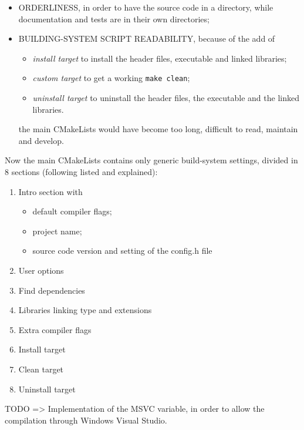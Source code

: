 \begin{itemize}
\item ORDERLINESS, in order to have the source code in a directory, while documentation and tests are in their own directories;
\item BUILDING-SYSTEM SCRIPT READABILITY, because of the add of
  \begin{itemize}
  \item \textit{install target} to install the header files, executable and linked libraries;
  \item \textit{custom target} to get a working \lstinline!make clean!;
  \item \textit{uninstall target} to uninstall the header files, the executable and the linked libraries.
  \end{itemize}
  the main CMakeLists would have become too long, difficult to read, maintain and develop.
\end{itemize}
\noindent Now the main CMakeLists contains only generic build-system settings, divided in 8 sections (following listed and explained):
\begin{enumerate}
\item Intro section with
  \begin{itemize}
  \item default compiler flags;
  \item project name;
  \item source code version and setting of the config.h file
  \end{itemize}
\item User options
\item Find dependencies
\item Libraries linking type and extensions
\item Extra compiler flags
\item Install target
\item Clean target
\item Uninstall target
\end{enumerate}
\medskip\noindent TODO => Implementation of the MSVC variable, in order to allow the compilation through Windows Visual Studio.
